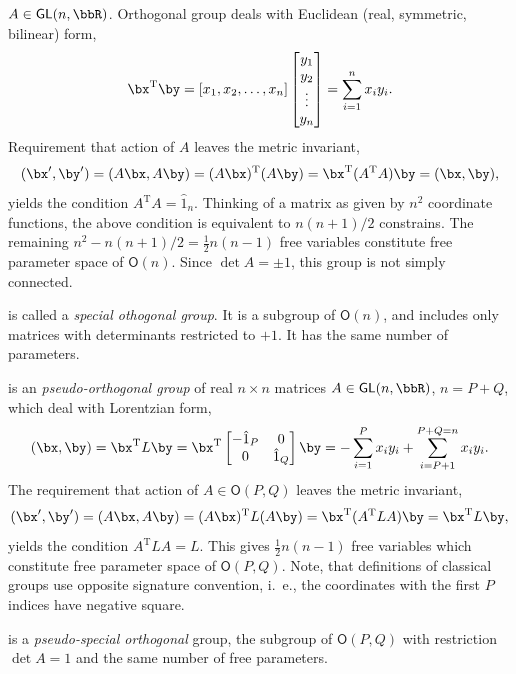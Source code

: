 \begin{unit}
\begin{description}
$A\in \mathsf{GL}(n,\bbR)$. Orthogonal group deals with Euclidean
(real, symmetric, bilinear) form,
\[
\bx^{\mathrm{T}}\by=[x_1,x_2,\ldots,
x_n]\begin{bmatrix}y_1\\y_2\\\vdots\\y_n\end{bmatrix}=\sum_{i=1}^n
x_i y_i.
\]
Requirement that action of $A$ leaves the metric invariant,
\[(\bx^\prime,\by^\prime)=(A\bx,A\by)=(A\bx)^{\mathrm{T}} (A\by)=\bx^{\mathrm{T}}(A^{\mathrm{T}}
A)\by=(\bx,\by),
\]
yields the condition $A^{\mathrm{T}} A = \hat{1}_n$.  Thinking of a matrix
as given by $n^2$ coordinate functions, the above condition is
equivalent to $n(n+1)/2$ constrains. The remaining
$n^2-n(n+1)/2=\tfrac{1}{2}n(n-1)$ free variables constitute free
parameter space of $\mathsf{O}(n)$. Since $\det
A=\pm 1$, this group is not simply connected.
%
\item[$\mathsf{SO}(n)$] is called a \textit{special othogonal
group}. It is a subgroup of $\mathsf{O}(n)$, and includes only
matrices with determinants restricted to $+1$. It has the same
number of parameters.
%
\item[$\mathsf{O}(P,Q)$] is an \textit{pseudo-orthogonal group} of
real $n\times n$ matrices $A\in \mathsf{GL}(n,\bbR)$, $n=P+Q$,
which deal with Lorentzian form,
\[
(\bx,\by)= \bx^{\mathrm{T}} L\by= \bx^{\mathrm{T}}
\begin{bmatrix}-\hat{1}_P&0\\0&\hat{1}_Q\end{bmatrix}\by=-\sum_{i=1}^P
x_i y_i +\sum_{i=P+1}^{P+Q=n} x_i y_i.
\]
The requirement that action of $A\in\mathsf{O}(P,Q)$ leaves the
metric invariant,
\[(\bx^\prime,\by^\prime)=(A\bx,A\by)=(A\bx)^{\mathrm{T}}L(A\by)=
\bx^{\mathrm{T}}(A^{\mathrm{T}}LA)\by=\bx^{\mathrm{T}}L\by,\]
yields the  condition $A^{\mathrm{T}}L A = L$. This gives
$\tfrac{1}{2}n(n-1)$ free variables which constitute free
parameter space of $\mathsf{O}(P,Q)$. Note, that definitions of
classical groups use opposite signature convention, i.~e., the
coordinates with the first $P$ indices have negative square.
%
\item[$\mathsf{SO}(P,Q)$] is a \textit{pseudo-special orthogonal}
group, the subgroup of $\mathsf{O}(P,Q)$ with restriction $\det A
=1$ and the same number of free parameters. \\[3pt]


\end{description}
\end{unit}
